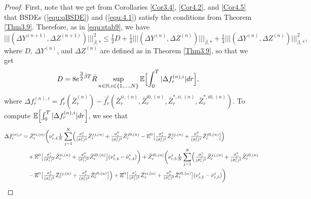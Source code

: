 \documentclass[10pt,a4paper]{article}
\newcommand{\bR}{\bar{R}}
\theoremstyle{plain}
\theoremstyle{definition}
\numberwithin{equation}{section}
\newcommand{\trinm}[1]{\vert\!\vert\!\vert #1 \vert\!\vert\!\vert}
\begin{document}
\begin{proof}



First, note that we get from Corollaries \ref{Cor3.4}, \ref{Cor4.2}, and \ref{Cor4.5} that BSDEs (\ref{equ:qBSDE}) and (\ref{equ:4.1}) satisfy the conditions from Theorem \ref{Thm3.9}. Therefore, as in \eqref{equ:stab9}, we have
\[
\trinm{(\Delta Y^{(n+1)},\Delta Z^{(n+1)})}_{\bar{\beta},*}^{2} \leq \tfrac{1}{2}D + \tfrac{1}{4} \trinm{(\Delta Y^{(n)},\Delta Z^{(n)})}_{\bar{\beta},*} + \tfrac{1}{4}\trinm{(\Delta Y^{(n)},\Delta Z^{(n)})}_{\bar{\beta},*}^{2},
\]
where $D$, $\Delta Y^{(n)}$, and $\Delta Z^{(n)}$ are defined as in Theorem \ref{Thm3.9},
so that we get
\begin{align}
D &= 8e^{\tfrac{3}{2} \bar{\beta} T} \bR \sup_{n \in \mathbb{N},i \in \{1,...,N\}}\mathbb{E}\Bigl[\int_{0}^{T}|\Delta f_{r}^{(n),i}|dr\Bigr], \nonumber
\end{align}
where
$
\Delta f_{r}^{(n),i} = f_{r}^{i}(\bar{Z}_{r}^{(n)})-\bar{f}_{r}^{i}(\bar{Z}_{r}^{ii,(n)},\bar{Z}_{r}^{i0,(n)},\bar{Z}_{r}^{*,ii,(n)},\bar{Z}_{r}^{*,i0,(n)}).
$
To compute $\mathbb{E}\Bigl[\int_{0}^{T}|\Delta f_{r}^{(n),i}|dr\Bigr]$, we see that
\begin{align}
\Delta f_{r}^{(n),i} &= \bar{Z}_{r}^{ii,(n)}\biggl(\nu_{r,4}^{i}\tfrac{1}{N}\sum_{j=1}^{N}\Bigl(\tfrac{\sigma_{r}^{j}}{(\bar{\sigma}_{r}^{j})^{2}}\bar{Z}_{r}^{jj,(n)} + \tfrac{\sigma_{r}^{0}}{(\bar{\sigma}_{r}^{j})^{2}}\bar{Z}_{r}^{j0,(n)} - \mathbb{E}^{0}\bigl[\tfrac{\sigma_{r}^{j}}{(\bar{\sigma}_{r}^{j})^{2}}\bar{Z}_{r}^{jj,(n)}+\tfrac{\sigma_{r}^{0}}{(\bar{\sigma}_{r}^{j})^{2}}\bar{Z}_{r}^{j0,(n)}\bigr]\Bigr) \nonumber \\
&\ \ \ + \mathbb{E}^{0}\bigl[\tfrac{\sigma_{r}^{i}}{(\bar{\sigma}_{r}^{i})^{2}}\bar{Z}_{r}^{ii,(n)}+\tfrac{\sigma_{r}^{0}}{(\bar{\sigma}_{r}^{i})^{2}}\bar{Z}_{r}^{i0,(n)}\bigr](\nu_{r,4}^{i}-\bar{\nu}_{r,4}^{i})\biggr) + \bar{Z}_{r}^{i0,(n)}\biggl(\nu_{r,5}^{i}\tfrac{1}{N}\sum_{j=1}^{N}\Bigl(\tfrac{\sigma_{r}^{j}}{(\bar{\sigma}_{r}^{j})^{2}}\bar{Z}_{r}^{jj,(n)} + \tfrac{\sigma_{r}^{0}}{(\bar{\sigma}_{r}^{j})^{2}}\bar{Z}_{r}^{j0,(n)} \nonumber \\
&\ \ \ - \mathbb{E}^{0}\bigl[\tfrac{\sigma_{r}^{j}}{(\bar{\sigma}_{r}^{j})^{2}}\bar{Z}_{r}^{jj,(n)}+\tfrac{\sigma_{r}^{0}}{(\bar{\sigma}_{r}^{j})^{2}}\bar{Z}_{r}^{j0,(n)}\bigr]\Bigr) + \mathbb{E}^{0}\bigl[\tfrac{\sigma_{r}^{i}}{(\bar{\sigma}_{r}^{i})^{2}}\bar{Z}_{r}^{ii,(n)}+\tfrac{\sigma_{r}^{0}}{(\bar{\sigma}_{r}^{i})^{2}}\bar{Z}_{r}^{i0,(n)}\bigr](\nu_{r,5}^{i}-\bar{\nu}_{r,5}^{i})\biggr) \nonumber \\

\end{align}
\end{proof}
\end{document}
